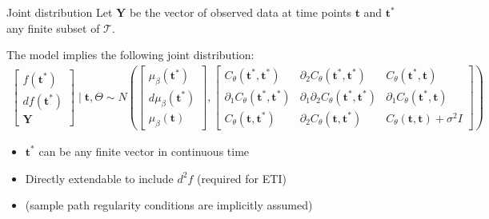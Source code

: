 \documentclass[ignorenonframetext,xcolor=pdflatex,table,dvipsnames,serif]{beamer}
\begin{document}
\begin{frame}{Joint distribution}
Let $\mathbf{Y}$ be the vector of observed data at time points $\mathbf{t}$ and $\mathbf{t}^\ast$ any finite subset of $\mathcal{T}$.

\vspace{1cm}

The model implies the following joint distribution:
{\scriptsize
\begin{align*}
  \begin{bmatrix}f(\mathbf{t}^\ast)\\ df(\mathbf{t}^\ast)\\ \mathbf{Y}\end{bmatrix} \mid \mathbf{t}, \Theta \sim N\left(\begin{bmatrix}\mu_\beta(\mathbf{t}^\ast)\\ d\mu_\beta(\mathbf{t}^\ast)\\ \mu_\beta(\mathbf{t})\end{bmatrix}, \begin{bmatrix}C_\theta(\mathbf{t}^\ast,\mathbf{t}^\ast) & \partial_2 C_\theta(\mathbf{t}^\ast, \mathbf{t}^\ast) & C_\theta(\mathbf{t}^\ast, \mathbf{t})\\ \partial_1 C_\theta(\mathbf{t}^\ast, \mathbf{t}^\ast) &  \partial_1 \partial_2 C_\theta(\mathbf{t}^\ast, \mathbf{t}^\ast) & \partial_1 C_\theta(\mathbf{t}^\ast, \mathbf{t})\\ C_\theta(\mathbf{t}, \mathbf{t}^\ast) & \partial_2 C_\theta(\mathbf{t}, \mathbf{t}^\ast) & C_\theta(\mathbf{t}, \mathbf{t}) + \sigma^2 I\end{bmatrix}\right)
\end{align*}
}%

\begin{itemize}
  \item{$\mathbf{t}^\ast$ can be any finite vector in continuous time}
  \item{Directly extendable to include $d^2\!f$ (required for ETI)}
  \item{(sample path regularity conditions are implicitly assumed)}
\end{itemize}
\end{frame}
\end{document}
